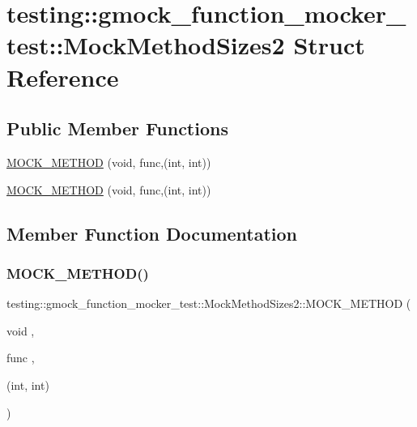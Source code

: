 \hypertarget{structtesting_1_1gmock__function__mocker__test_1_1_mock_method_sizes2}{}\section{testing\+::gmock\+\_\+function\+\_\+mocker\+\_\+test\+::Mock\+Method\+Sizes2 Struct Reference}
\label{structtesting_1_1gmock__function__mocker__test_1_1_mock_method_sizes2}
\subsection*{Public Member Functions}
\begin{DoxyCompactItemize}
\item 
\mbox{\hyperlink{structtesting_1_1gmock__function__mocker__test_1_1_mock_method_sizes2_a6d32c0eaef58a3fa35d67a2fe903d93b}{M\+O\+C\+K\+\_\+\+M\+E\+T\+H\+OD}} (void, func,(int, int))
\item 
\mbox{\hyperlink{structtesting_1_1gmock__function__mocker__test_1_1_mock_method_sizes2_a6d32c0eaef58a3fa35d67a2fe903d93b}{M\+O\+C\+K\+\_\+\+M\+E\+T\+H\+OD}} (void, func,(int, int))
\end{DoxyCompactItemize}


\subsection{Member Function Documentation}
\mbox{\label{structtesting_1_1gmock__function__mocker__test_1_1_mock_method_sizes2_a6d32c0eaef58a3fa35d67a2fe903d93b}} 
\subsubsection{\texorpdfstring{MOCK\_METHOD()}{MOCK\_METHOD()}\hspace{0.1cm}{\footnotesize\ttfamily [1/2]}}
{\footnotesize\ttfamily testing\+::gmock\+\_\+function\+\_\+mocker\+\_\+test\+::\+Mock\+Method\+Sizes2\+::\+M\+O\+C\+K\+\_\+\+M\+E\+T\+H\+OD (\begin{DoxyParamCaption}\item[{void}]{,  }\item[{func}]{,  }\item[{(int, int)}]{ }\end{DoxyParamCaption})}

